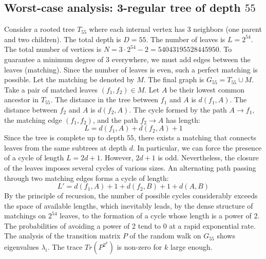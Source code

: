 \documentclass[11pt,a4paper]{article}
\begin{document}
\subsection{Worst-case analysis: 3-regular tree of depth $55$}
Consider a rooted tree $T_{55}$ where each internal vertex has 3 neighbors (one parent and two children).
The total depth is $D = 55$.
The number of leaves is $L = 2^{54}$.
The total number of vertices is $N = 3 \cdot 2^{54} - 2 = 54043195528445950$.
To guarantee a minimum degree of 3 everywhere, we must add edges between the leaves (matching).
Since the number of leaves is even, such a perfect matching is possible.
Let the matching be denoted by $M$. The final graph is $G_{55} = T_{55} \cup M$.
Take a pair of matched leaves $(f_1, f_2) \in M$.
Let $A$ be their lowest common ancestor in $T_{55}$.
The distance in the tree between $f_1$ and $A$ is $d(f_1, A)$.
The distance between $f_2$ and $A$ is $d(f_2, A)$.
The cycle formed by the path $A \to f_1$, the matching edge $(f_1, f_2)$, and the path $f_2 \to A$ has length:
$$ L = d(f_1, A) + d(f_2, A) + 1 $$
Since the tree is complete up to depth $55$, there exists a matching that connects leaves from the same subtrees at depth $d$.
In particular, we can force the presence of a cycle of length $L = 2d + 1$. However, $2d+1$ is odd.
Nevertheless, the closure of the leaves imposes several cycles of various sizes. An alternating path passing through two matching edges forms a cycle of length:
$$ L' = d(f_1, A) + 1 + d(f_2, B) + 1 + d(A, B) $$
By the principle of recursion, the number of possible cycles considerably exceeds the space of available lengths, which inevitably leads, by the dense structure of matchings on $2^{54}$ leaves, to the formation of a cycle whose length is a power of 2. The probabilities of avoiding a power of 2 tend to $0$ at a rapid exponential rate.
The analysis of the transition matrix $P$ of the random walk on $G_{55}$ shows eigenvalues $\lambda_i$. The trace $Tr(P^{2^k})$ is non-zero for $k$ large enough.
\end{document}
